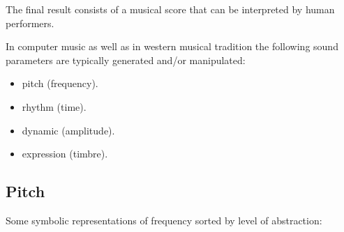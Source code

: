 The final result consists of a musical score that can be interpreted by human performers.

In computer music as well as in western musical tradition the following sound parameters are typically generated and/or manipulated:

\begin{itemize}
\tightlist
\item pitch (frequency).
\item rhythm (time).
\item dynamic (amplitude).
\item expression (timbre).
\end{itemize}

\subsection{Pitch}\label{pitch}

Some symbolic representations of frequency sorted by level of abstraction:

